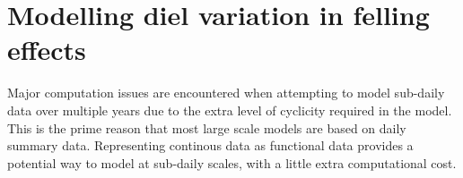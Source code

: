 




\section{Modelling diel variation in felling effects}

Major computation issues are encountered when attempting to model sub-daily data over multiple years due to the extra level of cyclicity required in the model.  This is the prime reason that most large scale models are based on daily summary data.  Representing continous data as functional data provides a potential way to model at sub-daily scales, with a little extra computational cost.

